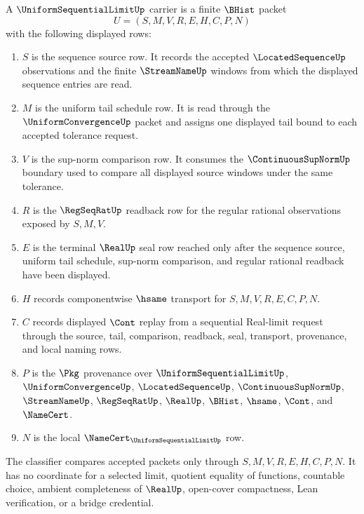 \begin{definition}\label{def:uniform-sequential-limit-carrier}
A $\UniformSequentialLimitUp$ carrier is a finite $\BHist$ packet
$$
U=(S,M,V,R,E,H,C,P,N)
$$
with the following displayed rows:
\begin{enumerate}
\item $S$ is the sequence source row. It records the accepted $\LocatedSequenceUp$ observations and the finite $\StreamNameUp$ windows from which the displayed sequence entries are read.
\item $M$ is the uniform tail schedule row. It is read through the $\UniformConvergenceUp$ packet and assigns one displayed tail bound to each accepted tolerance request.
\item $V$ is the sup-norm comparison row. It consumes the $\ContinuousSupNormUp$ boundary used to compare all displayed source windows under the same tolerance.
\item $R$ is the $\RegSeqRatUp$ readback row for the regular rational observations exposed by $S,M,V$.
\item $E$ is the terminal $\RealUp$ seal row reached only after the sequence source, uniform tail schedule, sup-norm comparison, and regular rational readback have been displayed.
\item $H$ records componentwise $\hsame$ transport for $S,M,V,R,E,C,P,N$.
\item $C$ records displayed $\Cont$ replay from a sequential Real-limit request through the source, tail, comparison, readback, seal, transport, provenance, and local naming rows.
\item $P$ is the $\Pkg$ provenance over $\UniformSequentialLimitUp$, $\UniformConvergenceUp$, $\LocatedSequenceUp$, $\ContinuousSupNormUp$, $\StreamNameUp$, $\RegSeqRatUp$, $\RealUp$, $\BHist$, $\hsame$, $\Cont$, and $\NameCert$.
\item $N$ is the local $\NameCert_{\UniformSequentialLimitUp}$ row.
\end{enumerate}
The classifier compares accepted packets only through $S,M,V,R,E,H,C,P,N$. It has no coordinate for a selected limit, quotient equality of functions, countable choice, ambient completeness of $\RealUp$, open-cover compactness, Lean verification, or a bridge credential.
\end{definition}

